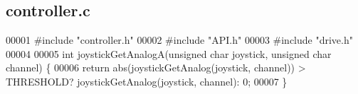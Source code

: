 \subsection{controller.\+c}
\label{controller_8c_source}

\begin{DoxyCode}
00001 \textcolor{preprocessor}{#include "controller.h"}
00002 \textcolor{preprocessor}{#include "API.h"}
00003 \textcolor{preprocessor}{#include "drive.h"}
00004 
00005 \textcolor{keywordtype}{int} joystickGetAnalogA(\textcolor{keywordtype}{unsigned} \textcolor{keywordtype}{char} joystick, \textcolor{keywordtype}{unsigned} \textcolor{keywordtype}{char} channel) \{
00006   \textcolor{keywordflow}{return} abs(joystickGetAnalog(joystick, channel)) > THRESHOLD? 
      joystickGetAnalog(joystick, channel): 0;
00007 \}
\end{DoxyCode}
